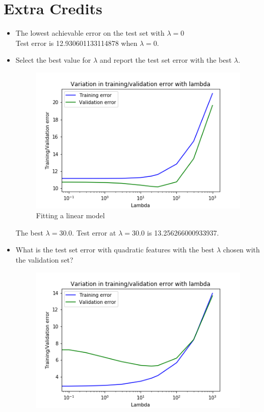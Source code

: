 \documentclass{article}
\begin{document}
\section{Extra Credits}
\begin{itemize}
    \item The lowest achievable error on the test set with $\lambda = 0$\\
    Test error is 12.930601133114878 when $\lambda = 0$.
    \item Select the best value for $\lambda$ and report the test set error with the best $\lambda$.\\
    \begin{figure}[htbp]
	\centering
	\includegraphics[scale = 0.4]{ex_select_lambda.png}
	\caption{Fitting a linear model}
\end{figure}
The best $\lambda = 30.0$. Test error at $\lambda = 30.0$ is 13.256266000933937.
\item What is the test set error with quadratic features with the best $\lambda$ chosen with the validation set?\\
\begin{figure}[htbp]
	\centering
	\includegraphics[scale = 0.4]{ex_select_lambda_poly.png}

\end{figure}
\end{itemize}
\end{document}
